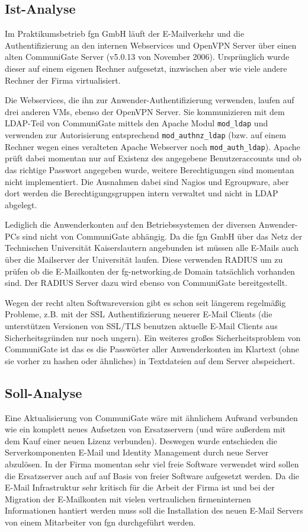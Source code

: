 \documentclass[11pt,a4paper,titlepage=firstiscover,headsepline]{scrartcl} %
\begin{document}
\subsection{Ist-Analyse}
Im Praktikumsbetrieb fgn GmbH läuft der E-Mailverkehr und die Authentifizierung an den internen Webservices und OpenVPN Server über einen alten CommuniGate Server (v5.0.13 von November 2006). Ursprünglich wurde dieser auf einem eigenen Rechner aufgesetzt, inzwischen aber wie viele andere Rechner der Firma virtualisiert. 

Die Webservices, die ihn zur Anwender-Authentifizierung verwenden, laufen auf drei anderen VMs, ebenso der OpenVPN Server. Sie kommunizieren mit dem LDAP-Teil von CommuniGate mittels den Apache Modul \texttt{mod\_ldap} und verwenden zur Autorisierung entsprechend \texttt{mod\_authnz\_ldap} (bzw. auf einem Rechner wegen eines veralteten Apache Webserver noch \texttt{mod\_auth\_ldap}). Apache prüft dabei momentan nur auf Existenz des angegebene Benutzeraccounts und ob das richtige Passwort angegeben wurde, weitere Berechtigungen sind momentan nicht implementiert. Die Ausnahmen dabei sind Nagios und Egroupware, aber dort werden die Berechtigungsgruppen intern verwaltet und nicht in LDAP abgelegt.

Lediglich die Anwenderkonten auf den Betriebssystemen der diversen Anwender-PCs sind nicht von CommuniGate abhängig. Da die fgn GmbH über das Netz der Technischen Universität Kaiserslautern angebunden ist müssen alle E-Mails auch über die Mailserver der Universität laufen. Diese verwenden RADIUS um zu prüfen ob die E-Mailkonten der fg-networking.de Domain tatsächlich vorhanden sind. Der RADIUS Server dazu wird ebenso von CommuniGate bereitgestellt. 

Wegen der recht alten Softwareversion gibt es schon seit längerem regelmäßig Probleme, z.B. mit der SSL Authentifizierung neuerer E-Mail Clients (die unterstützen Versionen von SSL/TLS benutzen aktuelle E-Mail Clients aus Sicherheitsgründen nur noch ungern). Ein weiteres großes Sicherheitsproblem von CommuniGate ist das es die Passwörter aller Anwenderkonten im Klartext (ohne sie vorher zu hashen oder ähnliches) in Textdateien auf dem Server abspeichert.

\subsection{Soll-Analyse}
Eine Aktualisierung von CommuniGate wäre mit ähnlichem Aufwand verbunden wie ein komplett neues Aufsetzen von Ersatzservern (und wäre außerdem mit dem Kauf einer neuen Lizenz verbunden). Deswegen wurde entschieden die Serverkomponenten E-Mail und Identity Management durch neue Server abzulösen. In der Firma momentan sehr viel freie Software verwendet wird sollen die Ersatzserver auch auf auf Basis von freier Software aufgesetzt werden. Da die E-Mail Infrastruktur sehr kritisch für die Arbeit der Firma ist und bei der Migration der E-Mailkonten mit vielen vertraulichen firmeninternen Informationen hantiert werden muss soll die Installation des neuen E-Mail Servers von einem Mitarbeiter von fgn durchgeführt werden.
\end{document}
